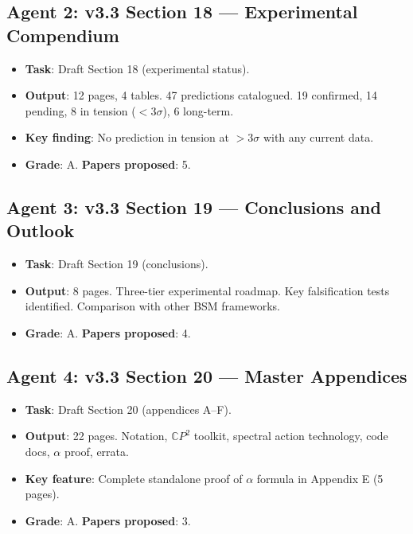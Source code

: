 \documentclass[11pt,a4paper]{article}
\newcommand{\CP}{\mathbb{C}P}
\begin{document}
\subsection{Agent 2: v3.3 Section 18 --- Experimental Compendium}
\begin{itemize}[nosep]
\item \textbf{Task}: Draft Section 18 (experimental status).
\item \textbf{Output}: 12 pages, 4 tables. 47 predictions catalogued. 19 confirmed, 14 pending, 8 in tension ($< 3\sigma$), 6 long-term.
\item \textbf{Key finding}: No prediction in tension at $> 3\sigma$ with any current data.
\item \textbf{Grade}: A. \textbf{Papers proposed}: 5.
\end{itemize}

\subsection{Agent 3: v3.3 Section 19 --- Conclusions and Outlook}
\begin{itemize}[nosep]
\item \textbf{Task}: Draft Section 19 (conclusions).
\item \textbf{Output}: 8 pages. Three-tier experimental roadmap. Key falsification tests identified. Comparison with other BSM frameworks.
\item \textbf{Grade}: A. \textbf{Papers proposed}: 4.
\end{itemize}

\subsection{Agent 4: v3.3 Section 20 --- Master Appendices}
\begin{itemize}[nosep]
\item \textbf{Task}: Draft Section 20 (appendices A--F).
\item \textbf{Output}: 22 pages. Notation, $\CP^2$ toolkit, spectral action technology, code docs, $\alpha$ proof, errata.
\item \textbf{Key feature}: Complete standalone proof of $\alpha$ formula in Appendix E (5 pages).
\item \textbf{Grade}: A. \textbf{Papers proposed}: 3.
\end{itemize}
\end{document}
